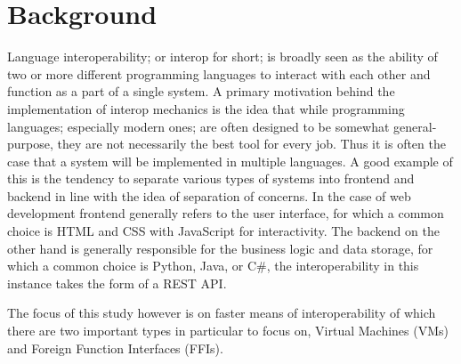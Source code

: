 \section{Background}\label{s:background}



Language interoperability; or interop for short; is broadly seen as the ability of two or more different programming languages to interact with each other and function as a part of a single system. A primary motivation behind the implementation of interop mechanics is the idea that while programming languages; especially modern ones; are often designed to be somewhat general-purpose, they are not necessarily the best tool for every job. Thus it is often the case that a system will be implemented in multiple languages. A good example of this is the tendency to separate various types of systems into frontend and backend in line with the idea of separation of concerns. In the case of web development frontend generally refers to the user interface, for which a common choice is HTML and CSS with JavaScript for interactivity. The backend on the other hand is generally responsible for the business logic and data storage, for which a common choice is Python, Java, or C\#, the interoperability in this instance takes the form of a REST API. 

The focus of this study however is on faster means of interoperability of which there are two important types in particular to focus on, Virtual Machines (VMs) and Foreign Function Interfaces (FFIs). 